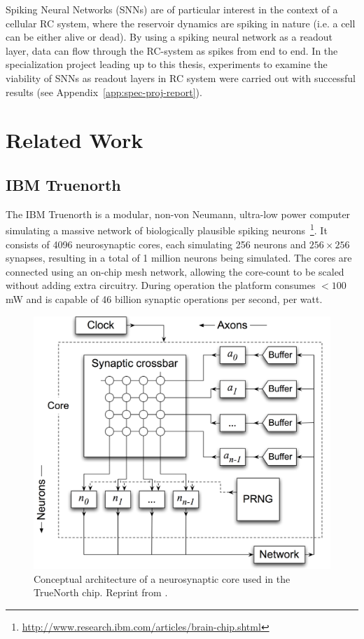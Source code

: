 Spiking Neural Networks (SNNs) are of particular interest in the context of a cellular
RC system, where the reservoir dynamics are spiking in nature (i.e. a cell can
be either alive or dead). By using a spiking neural network as a readout layer,
data can flow through the RC-system as spikes from end to end. In the
specialization project leading up to this thesis, experiments to examine the
viability of SNNs as readout layers in RC system were carried out with successful
results (see Appendix~\ref{app:spec-proj-report}).


\section{Related Work}
\label{sec:related-work}

\subsection{IBM Truenorth}
\label{sec:truenorth}

The IBM Truenorth is a modular, non-von Neumann, ultra-low power computer
simulating a massive network of biologically plausible spiking
neurons~\footnote{\url{http://www.research.ibm.com/articles/brain-chip.shtml}}.
It consists of 4096 neurosynaptic cores, each simulating 256 neurons and
$256\times256$ synapses, resulting in a total of 1 million neurons being
simulated. The cores are connected using an on-chip mesh network, allowing the
core-count to be scaled without adding extra circuitry. During operation the
platform consumes $< 100$ mW and is capable of 46 billion synaptic operations
per second, per watt.

\begin{figure}[ht]
  \centering
  \includegraphics[width=0.6\linewidth]{fig/truenorth-arch}
  \caption{Conceptual architecture of a neurosynaptic core used in the TrueNorth
  chip. Reprint from \cite{Preissl2012}.}
  \label{fig:truenorth-arch}
\end{figure}

